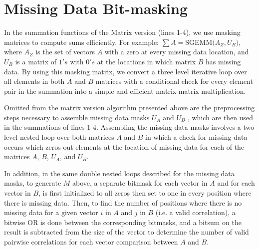 \documentclass{bioinfo}
\begin{document}
\section{Missing Data Bit-masking} \label{MDBM}
In the summation functions of the Matrix version (lines 1-4), we use masking matrices to compute 
sums efficiently. For example: $\sum A=\text{SGEMM(}A_Z,U_B\text{)}$, where $A_Z$ is the set of 
vectors $A$ with a zero at every missing data location, and $U_B$ is a matrix of $1's$ with $0's$ 
at the locations in which matrix $B$ has missing data. By using this masking matrix, we convert a 
three level iterative loop over all elements in both $A$ and $B$ matrices with a conditional check 
for every element pair in the summation into a simple and efficient matrix-matrix multiplication.

Omitted from the matrix version algorithm presented above are the preprocessing steps necessary to 
assemble missing data masks $U_A$ and $U_B$ , which are then used in the summations of lines 1-4.
Assembling the missing data masks involves a two level nested loop over both matrices $A$ and $B$ in 
which a check for missing data occurs which zeros out elements at the location of missing data for 
each of the matrices $A$, $B$, $U_A$, and $U_B$.

In addition, in the same double nested loops described for the missing data masks, to 
generate $M$ above, a separate bitmask for each vector in $A$ and for each vector in $B$, 
is first initialized to all zeros then set to one in every position where there is missing data.
Then, to find the number of positions where there is no missing data for a given vector $i$ 
in $A$ and $j$ in $B$ (i.e. a valid correlation), a bitwise OR is done between the corresponding bitmasks, 
and a bitsum on the result is subtracted from the size of the vector to determine the number of valid
pairwise correlations for each vector comparison between $A$ and $B$. 
\end{document}
